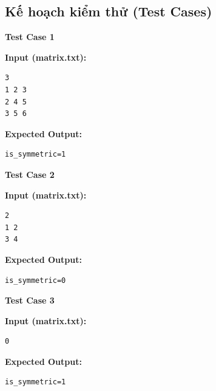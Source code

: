 \subsection{Kế hoạch kiểm thử (Test Cases)}

\textbf{Test Case 1}

\textbf{Input (matrix.txt):}
\begin{lstlisting}
3
1 2 3
2 4 5
3 5 6
\end{lstlisting}

\textbf{Expected Output:}
\begin{lstlisting}
is_symmetric=1
\end{lstlisting}

\textbf{Test Case 2}

\textbf{Input (matrix.txt):}
\begin{lstlisting}
2
1 2
3 4
\end{lstlisting}

\textbf{Expected Output:}
\begin{lstlisting}
is_symmetric=0
\end{lstlisting}

\textbf{Test Case 3}

\textbf{Input (matrix.txt):}
\begin{lstlisting}
0
\end{lstlisting}

\textbf{Expected Output:}
\begin{lstlisting}
is_symmetric=1
\end{lstlisting}